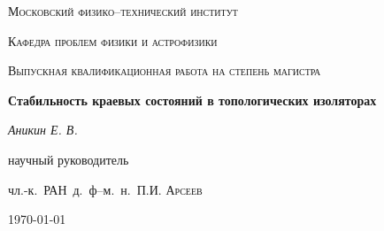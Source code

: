 \begin{titlepage}
	\centering
	{\scshape\LARGE Московский физико--технический институт\par}
	{\scshape Кафедра проблем физики и астрофизики \par}
	\vspace{1cm}
	{\scshape\Large Выпускная квалификационная работа на степень магистра\par}
	\vspace{1.5cm}
	{\huge\bfseries Стабильность краевых состояний в топологических изоляторах
        \par}

	\vspace{2cm}
	{\Large\itshape Аникин Е. В.\par}
	\vfill
	научный руководитель\par
	чл.-к.~РАН~д.~ф--м.~н.~П.И. \textsc{Арсеев}

	\vfill

	{\large \today\par}
\end{titlepage}
